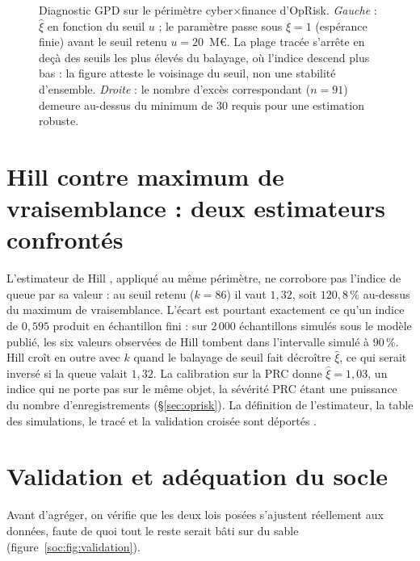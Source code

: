 \begin{figure}[htbp]
\centering
{}
\caption{Diagnostic GPD sur le périmètre cyber$\times$finance d'OpRisk.
\emph{Gauche} : $\hat{\xi}$ en fonction du seuil $u$ ; le paramètre passe sous
$\xi = 1$ (espérance finie) avant le seuil retenu $u = 20$~M\euro. La plage tracée
s'arrête en deçà des seuils les plus élevés du balayage, où l'indice descend plus bas :
la figure atteste le voisinage du seuil, non une stabilité d'ensemble.
\emph{Droite} : le nombre d'excès correspondant ($n = 91$) demeure au-dessus du
minimum de $30$ requis pour une estimation robuste.}
\label{soc:fig:diagnostic-gpd}
\end{figure}

\section{Hill contre maximum de vraisemblance : deux estimateurs confrontés}


L'estimateur de Hill \citep{Hill1975}, appliqué au même périmètre, ne corrobore pas l'indice de
queue par sa valeur : au seuil retenu ($k=86$) il vaut $1{,}32$, soit $120{,}8\,\%$ au-dessus du
maximum de vraisemblance. L'écart est pourtant exactement ce qu'un indice de $0{,}595$ produit en
échantillon fini : sur $2\,000$ échantillons simulés sous le modèle publié, les six valeurs
observées de Hill tombent dans l'intervalle simulé à $90\,\%$. Hill croît en outre avec $k$ quand
le balayage de seuil fait décroître $\hat\xi$, ce qui serait inversé si la queue valait $1{,}32$.
La calibration sur la PRC donne $\hat\xi = 1{,}03$, un indice qui ne porte pas sur le même
objet, la sévérité PRC étant une puissance du nombre d'enregistrements (\S\ref{sec:oprisk}). La
définition de l'estimateur, la table des simulations, le tracé et la validation croisée sont
déportés \matcomp.

\section{Validation et adéquation du socle}
\label{soc:sec:validation}

Avant d'agréger, on vérifie que les deux lois posées s'ajustent réellement aux données, faute
de quoi tout le reste serait bâti sur du sable (figure~\ref{soc:fig:validation}).


